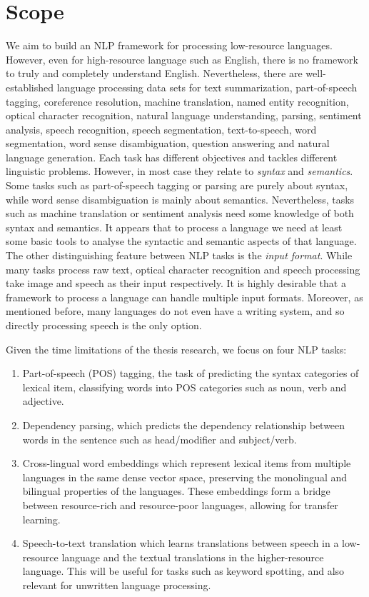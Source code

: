 \documentclass[12pt,twoside,final,hidelinks]{ltthesis}
\theoremstyle{definition}
\begin{document}
\section{Scope}
We aim to build an NLP framework for processing low-resource languages. However, even for high-resource language such as English, there is no framework to truly and completely understand English. Nevertheless, there are well-established language processing data sets for text summarization, part-of-speech tagging, coreference resolution, machine translation, named entity recognition, optical character recognition, natural language understanding, parsing, sentiment analysis, speech recognition, speech segmentation, text-to-speech, word segmentation, word sense disambiguation, question answering and natural language generation. 
Each task has different objectives and tackles different linguistic problems. However, in most case they relate to \textit{syntax} and \textit{semantics}. Some tasks such as part-of-speech tagging or parsing are purely about syntax, while word sense disambiguation is mainly about semantics. Nevertheless, tasks such as machine translation or sentiment analysis need some knowledge of both syntax and semantics. It appears that to process a language we need at least some basic tools to analyse the syntactic and semantic aspects of that language. 
The other distinguishing feature between NLP tasks is the \textit{input format}. While many tasks process raw text, optical character recognition and speech processing take image and speech as their input respectively. It is highly desirable that a framework to process a language can handle multiple input formats. Moreover, as mentioned before, many languages do not even have a writing system, and so directly processing speech is the only option. 

\noindent Given the time limitations of the thesis research, we focus on four NLP tasks:
\begin{enumerate}
\item Part-of-speech (POS) tagging, the task of predicting the syntax categories of lexical item, classifying words into POS categories such as noun, verb and adjective.
\item Dependency parsing, which predicts the dependency relationship between words in the sentence such as head/modifier and subject/verb. 
\item Cross-lingual word embeddings which represent lexical items from multiple languages in the same dense vector space, preserving the monolingual and bilingual properties of the languages. These embeddings form a bridge between resource-rich and resource-poor languages, allowing for transfer learning. 
\item Speech-to-text translation which learns translations between speech in a low-resource language and the textual translations in the higher-resource language. This will be useful for tasks such as keyword spotting, and also relevant for unwritten language processing.  

\end{enumerate}
\end{document}
